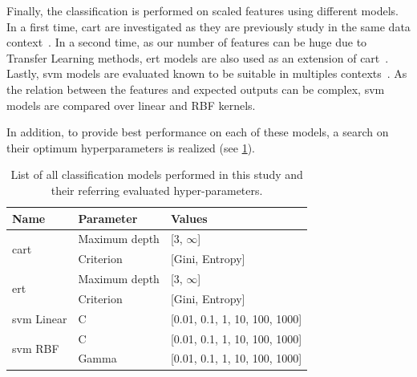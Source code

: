 \documentclass[journal,article,submit,moreauthors,pdftex, applsci]{Definitions/mdpi}
\begin{document}
Finally, the classification is performed on scaled features using different models. In a first time, \ac{cart} are investigated as they are previously study in the same data context~\cite{Wiltgen2008}. In a second time, as our number of features can be huge due to Transfer Learning methods, \ac{ert} models are also used as an extension of \ac{cart}~\cite{Geurts2006}. Lastly, \ac{svm} models are evaluated known to be suitable in multiples contexts~\cite{Smach2008a,Kose2016b}. As the relation between the features and expected outputs can be complex, \ac{svm} models are compared over linear and RBF kernels.\par
In addition, to provide best performance on each of these models, a search on their optimum hyperparameters is realized (see \cref{tab:image_hyperparameters}).\par
\begin{table}[]
    \centering
    \begin{tabular}{lll}
    \textbf{Name}                   & \textbf{Parameter}& \textbf{Values}               \\ \hline
    \multirow{2}{*}{\ac{cart}}      & Maximum depth     & [3, $\infty$]                 \\ \cline{2-3}
                                    & Criterion         & [Gini, Entropy]               \\ \hline 
    \multirow{2}{*}{\ac{ert}}       & Maximum depth     & [3, $\infty$]                 \\ \cline{2-3}
                                    & Criterion         & [Gini, Entropy]               \\ \hline 
    \ac{svm} Linear                 & C                 & [0.01, 0.1, 1, 10, 100, 1000] \\ \hline
    \multirow{2}{*}{\ac{svm} RBF}   & C                 & [0.01, 0.1, 1, 10, 100, 1000] \\ \cline{2-3}
                                    & Gamma             & [0.01, 0.1, 1, 10, 100, 1000] \\ \hline 
    \end{tabular}    
    \caption{List of all classification models performed in this study and their referring evaluated hyper-parameters.}
    \label{tab:image_hyperparameters}
\end{table}\par


\end{document}
